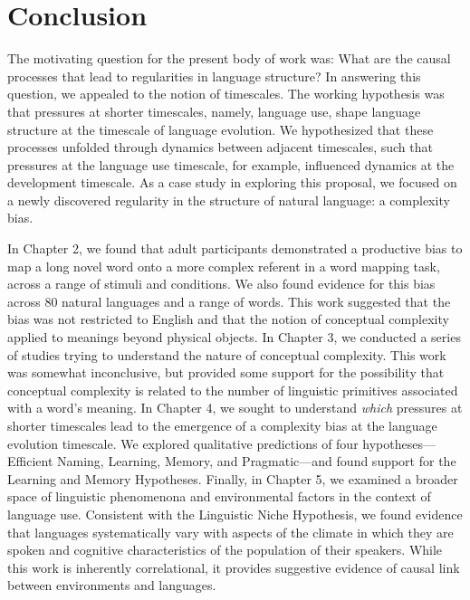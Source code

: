 
\chapter{Conclusion}
\label{chapter:conclusion}
The motivating question for the present body of work was: What are the causal processes that lead to regularities in language structure?   In answering this question, we appealed to the notion of timescales. The working hypothesis was that pressures at shorter timescales, namely, language use, shape language structure at the timescale of language evolution. We hypothesized that these processes unfolded through dynamics between adjacent timescales, such that pressures at the language use timescale, for example, influenced dynamics at the development timescale.  As a case study in exploring this proposal, we focused on a newly discovered regularity in the structure of natural language: a complexity bias.

In Chapter 2, we found that adult participants demonstrated a productive bias to map a long novel word onto a more complex referent in a word mapping task, across a range of stimuli and conditions. We  also found evidence for this bias across 80 natural languages and a range of words. This work suggested that  the bias was not restricted to English and that the notion of conceptual complexity applied to meanings beyond physical objects. In Chapter 3, we conducted a series of studies trying to understand the nature of conceptual complexity. This work was somewhat inconclusive, but provided some support for the possibility that conceptual complexity is related to the number of linguistic primitives associated with a word's meaning. In Chapter 4, we sought to understand {\it which} pressures at shorter timescales lead to the emergence of a complexity bias at the language evolution timescale. We explored qualitative predictions of four hypotheses---Efficient Naming, Learning, Memory, and Pragmatic---and found support for the Learning and Memory Hypotheses. Finally, in Chapter 5, we examined a broader space of linguistic phenomenona and environmental factors in the context of language use. Consistent with the Linguistic Niche Hypothesis, we found evidence that languages systematically vary with aspects of the climate in which they are spoken and cognitive characteristics of the population of their speakers. While this work is inherently correlational, it provides suggestive evidence of causal link between environments and languages.

